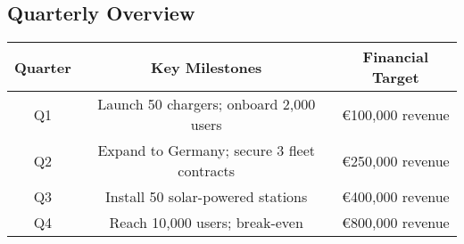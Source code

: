 \subsection*{Quarterly Overview}
\begin{tabular}{|c|c|c|}
\hline
\textbf{Quarter} & \textbf{Key Milestones} & \textbf{Financial Target} \\
\hline
Q1 & Launch 50 chargers; onboard 2,000 users & €100,000 revenue \\
Q2 & Expand to Germany; secure 3 fleet contracts & €250,000 revenue \\
Q3 & Install 50 solar-powered stations & €400,000 revenue \\
Q4 & Reach 10,000 users; break-even & €800,000 revenue \\
\hline
\end{tabular}

\noindent

